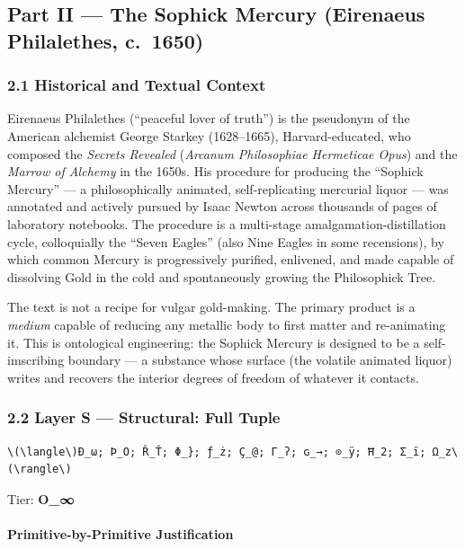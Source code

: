 \subsection{Part II --- The Sophick Mercury (Eirenaeus Philalethes,
c.~1650)}\label{part-ii-the-sophick-mercury-eirenaeus-philalethes-c.-1650}

\subsubsection{2.1 Historical and Textual
Context}\label{historical-and-textual-context}

Eirenaeus Philalethes (``peaceful lover of truth'') is the pseudonym of
the American alchemist George Starkey (1628--1665), Harvard-educated,
who composed the \emph{Secrets Revealed} (\emph{Arcanum Philosophiae
Hermeticae Opus}) and the \emph{Marrow of Alchemy} in the 1650s. His
procedure for producing the ``Sophick Mercury'' --- a philosophically
animated, self-replicating mercurial liquor --- was annotated and
actively pursued by Isaac Newton across thousands of pages of laboratory
notebooks. The procedure is a multi-stage amalgamation-distillation
cycle, colloquially the ``Seven Eagles'' (also Nine Eagles in some
recensions), by which common Mercury is progressively purified,
enlivened, and made capable of dissolving Gold in the cold and
spontaneously growing the Philosophick Tree.

The text is not a recipe for vulgar gold-making. The primary product is
a \emph{medium} capable of reducing any metallic body to first matter
and re-animating it. This is ontological engineering: the Sophick
Mercury is designed to be a self-imscribing boundary --- a substance
whose surface (the volatile animated liquor) writes and recovers the
interior degrees of freedom of whatever it contacts.

\subsubsection{2.2 Layer S --- Structural: Full
Tuple}\label{layer-s-structural-full-tuple}

\begin{verbatim}
\(\langle\)Ð_ω; Þ_O; Ř_Ť; Φ_}; ƒ_ż; Ç_@; Γ_ʔ; ɢ_→; ⊙_ÿ; Ħ_2; Σ_ï; Ω_z\(\rangle\)
\end{verbatim}

Tier: \textbf{O\_∞}

\paragraph{Primitive-by-Primitive
Justification}\label{primitive-by-primitive-justification}


